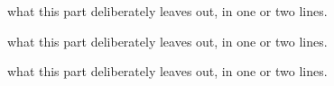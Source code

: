 \documentclass[10pt, twoside, openany]{book}
\begin{document}


\frontmatter


\tableofcontents

\mainmatter

  {what this part deliberately leaves out, in one or two lines.}



  {what this part deliberately leaves out, in one or two lines.}


  {what this part deliberately leaves out, in one or two lines.}




\appendix


\backmatter
\printindex


\end{document}
